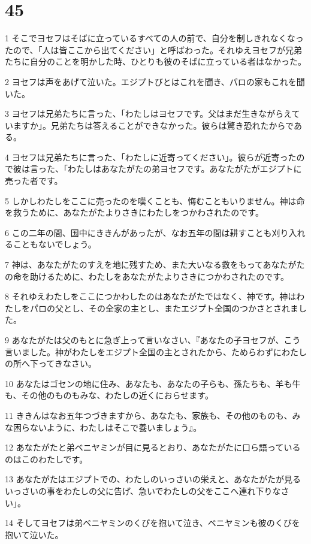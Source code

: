 \chapter{45}

\par 1 そこでヨセフはそばに立っているすべての人の前で、自分を制しきれなくなったので、「人は皆ここから出てください」と呼ばわった。それゆえヨセフが兄弟たちに自分のことを明かした時、ひとりも彼のそばに立っている者はなかった。
\par 2 ヨセフは声をあげて泣いた。エジプトびとはこれを聞き、パロの家もこれを聞いた。
\par 3 ヨセフは兄弟たちに言った、「わたしはヨセフです。父はまだ生きながらえていますか」。兄弟たちは答えることができなかった。彼らは驚き恐れたからである。
\par 4 ヨセフは兄弟たちに言った、「わたしに近寄ってください」。彼らが近寄ったので彼は言った、「わたしはあなたがたの弟ヨセフです。あなたがたがエジプトに売った者です。
\par 5 しかしわたしをここに売ったのを嘆くことも、悔むこともいりません。神は命を救うために、あなたがたよりさきにわたしをつかわされたのです。
\par 6 この二年の間、国中にききんがあったが、なお五年の間は耕すことも刈り入れることもないでしょう。
\par 7 神は、あなたがたのすえを地に残すため、また大いなる救をもってあなたがたの命を助けるために、わたしをあなたがたよりさきにつかわされたのです。
\par 8 それゆえわたしをここにつかわしたのはあなたがたではなく、神です。神はわたしをパロの父とし、その全家の主とし、またエジプト全国のつかさとされました。
\par 9 あなたがたは父のもとに急ぎ上って言いなさい、『あなたの子ヨセフが、こう言いました。神がわたしをエジプト全国の主とされたから、ためらわずにわたしの所へ下ってきなさい。
\par 10 あなたはゴセンの地に住み、あなたも、あなたの子らも、孫たちも、羊も牛も、その他のものもみな、わたしの近くにおらせます。
\par 11 ききんはなお五年つづきますから、あなたも、家族も、その他のものも、みな困らないように、わたしはそこで養いましょう』。
\par 12 あなたがたと弟ベニヤミンが目に見るとおり、あなたがたに口ら語っているのはこのわたしです。
\par 13 あなたがたはエジプトでの、わたしのいっさいの栄えと、あなたがたが見るいっさいの事をわたしの父に告げ、急いでわたしの父をここへ連れ下りなさい」。
\par 14 そしてヨセフは弟ベニヤミンのくびを抱いて泣き、ベニヤミンも彼のくびを抱いて泣いた。
